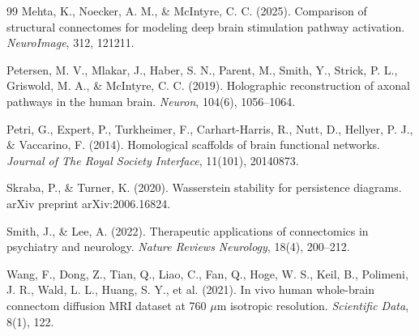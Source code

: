 \documentclass[12pt,a4paper]{article}
\begin{document}
\begin{thebibliography}{99}
Mehta, K., Noecker, A. M., \& McIntyre, C. C. (2025).
Comparison of structural connectomes for modeling deep brain stimulation pathway activation.
\textit{NeuroImage}, 312, 121211.

Petersen, M. V., Mlakar, J., Haber, S. N., Parent, M., Smith, Y., Strick, P. L., Griswold, M. A., \& McIntyre, C. C. (2019).
Holographic reconstruction of axonal pathways in the human brain.
\textit{Neuron}, 104(6), 1056--1064.

Petri, G., Expert, P., Turkheimer, F., Carhart-Harris, R., Nutt, D., Hellyer, P. J., \& Vaccarino, F. (2014).
Homological scaffolds of brain functional networks.
\textit{Journal of The Royal Society Interface}, 11(101), 20140873.

Skraba, P., \& Turner, K. (2020).
Wasserstein stability for persistence diagrams.
arXiv preprint arXiv:2006.16824.

Smith, J., \& Lee, A. (2022).
Therapeutic applications of connectomics in psychiatry and neurology.
\textit{Nature Reviews Neurology}, 18(4), 200--212.

Wang, F., Dong, Z., Tian, Q., Liao, C., Fan, Q., Hoge, W. S., Keil, B., Polimeni, J. R., Wald, L. L., Huang, S. Y., et al. (2021).
In vivo human whole-brain connectom diffusion MRI dataset at 760 $\mu$m isotropic resolution.
\textit{Scientific Data}, 8(1), 122.

\end{thebibliography}
\end{document}
